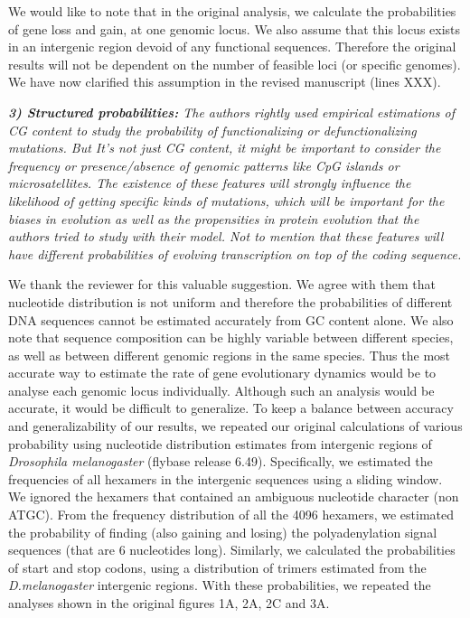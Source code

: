 \documentclass[12pt,a4paper]{article}
\begin{document}
We would like to note that in the original analysis, we calculate the probabilities of gene loss and gain, at one genomic locus. We also assume that this locus exists in an intergenic region devoid of any functional sequences. Therefore the original results will not be dependent on the number of feasible loci (or specific genomes). We have now clarified this assumption in the revised manuscript (lines XXX). 

{\itshape \textbf{3) Structured probabilities:} The authors rightly used empirical estimations of CG content to study the probability of functionalizing or defunctionalizing mutations. But It's not just CG content, it might be important to consider the frequency or presence/absence of genomic patterns like CpG islands or microsatellites. The existence of these features will strongly influence the likelihood of getting specific kinds of mutations, which will be important for the biases in evolution as well as the propensities in protein evolution that the authors tried to study with their model. Not to mention that these features will have different probabilities of evolving transcription on top of the coding sequence.}



We thank the reviewer for this valuable suggestion. We agree with them that nucleotide distribution is not uniform and therefore the probabilities of different DNA sequences cannot be estimated accurately from GC content alone. We also note that sequence composition can be highly variable between different species, as well as between different genomic regions in the same species. Thus the most accurate way to estimate the rate of gene evolutionary dynamics would be to analyse each genomic locus individually. Although such an analysis would be accurate, it would be difficult to generalize. To keep a balance between accuracy and generalizability of our results, we repeated our original calculations of various probability using nucleotide distribution estimates from intergenic regions of \textit{Drosophila melanogaster}  (flybase release 6.49). Specifically, we estimated the frequencies of all hexamers in the intergenic sequences using a sliding window. We ignored the hexamers that contained an ambiguous nucleotide character (non ATGC). From the frequency distribution of all the 4096 hexamers, we estimated the probability of finding (also gaining and losing) the polyadenylation signal sequences (that are 6 nucleotides long). Similarly, we calculated the probabilities of start and stop codons, using a distribution of trimers estimated from the \textit{D.melanogaster} intergenic regions. With these probabilities, we repeated the analyses shown in the original figures 1A, 2A, 2C and 3A. 
\end{document}
